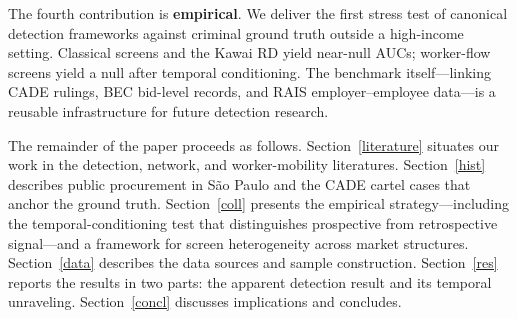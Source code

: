 The fourth contribution is \textbf{empirical}. We deliver the first stress test of canonical detection frameworks against criminal ground truth outside a high-income setting. Classical screens and the Kawai RD yield near-null AUCs; worker-flow screens yield a null after temporal conditioning. The benchmark itself---linking CADE rulings, BEC bid-level records, and RAIS employer--employee data---is a reusable infrastructure for future detection research.

The remainder of the paper proceeds as follows. Section~\ref{literature} situates our work in the detection, network, and worker-mobility literatures. Section~\ref{hist} describes public procurement in S\~{a}o Paulo and the CADE cartel cases that anchor the ground truth. Section~\ref{coll} presents the empirical strategy---including the temporal-conditioning test that distinguishes prospective from retrospective signal---and a framework for screen heterogeneity across market structures. Section~\ref{data} describes the data sources and sample construction. Section~\ref{res} reports the results in two parts: the apparent detection result and its temporal unraveling. Section~\ref{concl} discusses implications and concludes.
